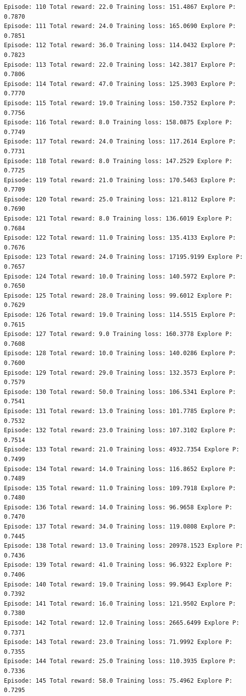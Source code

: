 \documentclass[11pt]{article}
\begin{document}
\begin{Verbatim}[commandchars=\\\{\}]
Episode: 110 Total reward: 22.0 Training loss: 151.4867 Explore P: 0.7870
Episode: 111 Total reward: 24.0 Training loss: 165.0690 Explore P: 0.7851
Episode: 112 Total reward: 36.0 Training loss: 114.0432 Explore P: 0.7823
Episode: 113 Total reward: 22.0 Training loss: 142.3817 Explore P: 0.7806
Episode: 114 Total reward: 47.0 Training loss: 125.3903 Explore P: 0.7770
Episode: 115 Total reward: 19.0 Training loss: 150.7352 Explore P: 0.7756
Episode: 116 Total reward: 8.0 Training loss: 158.0875 Explore P: 0.7749
Episode: 117 Total reward: 24.0 Training loss: 117.2614 Explore P: 0.7731
Episode: 118 Total reward: 8.0 Training loss: 147.2529 Explore P: 0.7725
Episode: 119 Total reward: 21.0 Training loss: 170.5463 Explore P: 0.7709
Episode: 120 Total reward: 25.0 Training loss: 121.8112 Explore P: 0.7690
Episode: 121 Total reward: 8.0 Training loss: 136.6019 Explore P: 0.7684
Episode: 122 Total reward: 11.0 Training loss: 135.4133 Explore P: 0.7676
Episode: 123 Total reward: 24.0 Training loss: 17195.9199 Explore P: 0.7657
Episode: 124 Total reward: 10.0 Training loss: 140.5972 Explore P: 0.7650
Episode: 125 Total reward: 28.0 Training loss: 99.6012 Explore P: 0.7629
Episode: 126 Total reward: 19.0 Training loss: 114.5515 Explore P: 0.7615
Episode: 127 Total reward: 9.0 Training loss: 160.3778 Explore P: 0.7608
Episode: 128 Total reward: 10.0 Training loss: 140.0286 Explore P: 0.7600
Episode: 129 Total reward: 29.0 Training loss: 132.3573 Explore P: 0.7579
Episode: 130 Total reward: 50.0 Training loss: 106.5341 Explore P: 0.7541
Episode: 131 Total reward: 13.0 Training loss: 101.7785 Explore P: 0.7532
Episode: 132 Total reward: 23.0 Training loss: 107.3102 Explore P: 0.7514
Episode: 133 Total reward: 21.0 Training loss: 4932.7354 Explore P: 0.7499
Episode: 134 Total reward: 14.0 Training loss: 116.8652 Explore P: 0.7489
Episode: 135 Total reward: 11.0 Training loss: 109.7918 Explore P: 0.7480
Episode: 136 Total reward: 14.0 Training loss: 96.9658 Explore P: 0.7470
Episode: 137 Total reward: 34.0 Training loss: 119.0808 Explore P: 0.7445
Episode: 138 Total reward: 13.0 Training loss: 20978.1523 Explore P: 0.7436
Episode: 139 Total reward: 41.0 Training loss: 96.9322 Explore P: 0.7406
Episode: 140 Total reward: 19.0 Training loss: 99.9643 Explore P: 0.7392
Episode: 141 Total reward: 16.0 Training loss: 121.9502 Explore P: 0.7380
Episode: 142 Total reward: 12.0 Training loss: 2665.6499 Explore P: 0.7371
Episode: 143 Total reward: 23.0 Training loss: 71.9992 Explore P: 0.7355
Episode: 144 Total reward: 25.0 Training loss: 110.3935 Explore P: 0.7336
Episode: 145 Total reward: 58.0 Training loss: 75.4962 Explore P: 0.7295

\end{Verbatim}
\end{document}
